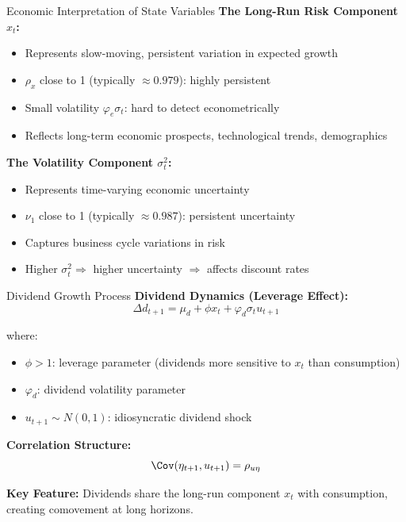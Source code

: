 \documentclass{beamer}
\begin{document}
\begin{frame}{Economic Interpretation of State Variables}
    \textbf{The Long-Run Risk Component $x_t$:}
    \begin{itemize}
        \item Represents slow-moving, persistent variation in expected growth
        \item $\rho_x$ close to 1 (typically $\approx 0.979$): highly persistent
        \item Small volatility $\varphi_e \sigma_t$: hard to detect econometrically
        \item Reflects long-term economic prospects, technological trends, demographics
    \end{itemize}
    
    \vspace{0.3cm}
    \textbf{The Volatility Component $\sigma_t^2$:}
    \begin{itemize}
        \item Represents time-varying economic uncertainty
        \item $\nu_1$ close to 1 (typically $\approx 0.987$): persistent uncertainty
        \item Captures business cycle variations in risk
        \item Higher $\sigma_t^2 \Rightarrow$ higher uncertainty $\Rightarrow$ affects discount rates
    \end{itemize}
\end{frame}

\begin{frame}{Dividend Growth Process}
    \textbf{Dividend Dynamics (Leverage Effect):}
    \begin{equation}
        \Delta d_{t+1} = \mu_d + \phi x_t + \varphi_d \sigma_t u_{t+1}
    \end{equation}
    
    where:
    \begin{itemize}
        \item $\phi > 1$: leverage parameter (dividends more sensitive to $x_t$ than consumption)
        \item $\varphi_d$: dividend volatility parameter
        \item $u_{t+1} \sim N(0,1)$: idiosyncratic dividend shock
    \end{itemize}
    
    \vspace{0.3cm}
    \textbf{Correlation Structure:}
    \begin{equation}
        \Cov(\eta_{t+1}, u_{t+1}) = \rho_{u\eta}
    \end{equation}
    
    \textbf{Key Feature:} Dividends share the long-run component $x_t$ with consumption, creating comovement at long horizons.
\end{frame}
\end{document}
